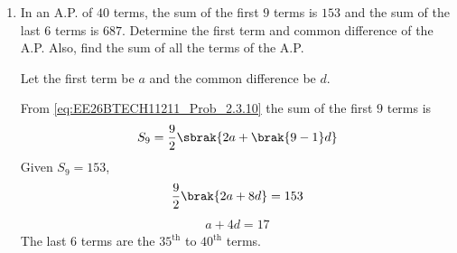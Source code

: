 \begin{enumerate}[label=\thesubsection.\arabic*, ref=\thesubsection.\theenumi]
Hence,
\begin{align}
x=2 \quad \text{or} \quad x=30
\end{align}
The corresponding pairs of first and eighth terms are \(\brak{2,30}\) or \(\brak{30,2}\).

Taking the first term as \(a=2\) and the eighth term as \(a+7d=30\),
\begin{align}
2+7d=30
\end{align}
\begin{align}
a=2,\quad d=4
\end{align}
From \eqref{eq:EE26BTECH11211_Prob_2.3.10} the sum of the first \(20\) terms is
\begin{align}
S_{20}=\frac{20}{2}\sbrak{2a+\brak{20-1}d}
\end{align}
Substituting \(a=2\) and \(d=4\),
\begin{align}
S_{20}=10\sbrak{2\brak{2}+19\brak{4}}
\end{align}
\begin{align}
S_{20}=800
\end{align}

\item
 In an A.P. of \(40\) terms, the sum of the first \(9\) terms is \(153\) and the sum of the last \(6\) terms is \(687\). Determine the first term and common difference of the A.P. Also, find the sum of all the terms of the A.P.

\solution

Let the first term be \(a\) and the common difference be \(d\).

From \eqref{eq:EE26BTECH11211_Prob_2.3.10} the sum of the first \(9\) terms is
\begin{align}
S_9=\frac{9}{2}\sbrak{2a+\brak{9-1}d}
\end{align}
Given \(S_9=153\),
\begin{align}
\frac{9}{2}\brak{2a+8d}=153
\end{align}
\begin{align}
a+4d=17 \label{eq:EE26BTECH11211_Prob_34.1.10}
\end{align}
The last \(6\) terms are the \(35^\text{th}\) to \(40^\text{th}\) terms.


\end{enumerate}
